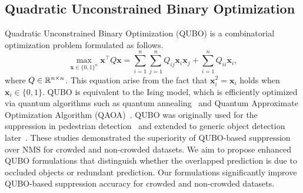 \subsection{Quadratic Unconstrained Binary Optimization}
Quadratic Unconstrained Binary Optimization (QUBO) is a combinatorial optimization problem formulated as follows.
\begin{equation}
    \max_{\bm{x}\in\{0, 1\}^n}\bm{x}^\top Q\bm{x} = \sum_{i=1}^{n}\sum_{j=1}^{n}Q_{ij}\bm{x}_{i}\bm{x}_{j}+\sum_{i=1}^{n} Q_{ii}\bm{x}_i,
\end{equation}
where $Q\in\mathbb{R}^{n\times n}$.
This equation arise from the fact that $\bm{x}_{i}^2=\bm{x}_{i}$ holds when $\bm{x}_i\in\{0, 1\}$.
QUBO is equivalent to the Ising model, which is efficiently optimized via quantum algorithms such as quantum annealing~\cite{PhysRevE.58.5355Nishimori,morita2008mathematical} and Quantum Approximate Optimization Algorithm (QAOA)~\cite{farhi2014quantum}.
QUBO was originally used for the suppression in pedestrian detection~\cite{rujikietgumjorn2013qubo} and extended to generic object detection later~\cite{li2020qsqs}. These studies demonstrated the superiority of QUBO-based suppression over NMS for crowded and non-crowded datasets.
We aim to propose enhanced QUBO formulations that distinguish whether the overlapped prediction is due to occluded objects or redundant prediction.
Our formulations significantly improve QUBO-based suppression accuracy for crowded and non-crowded datasets.


